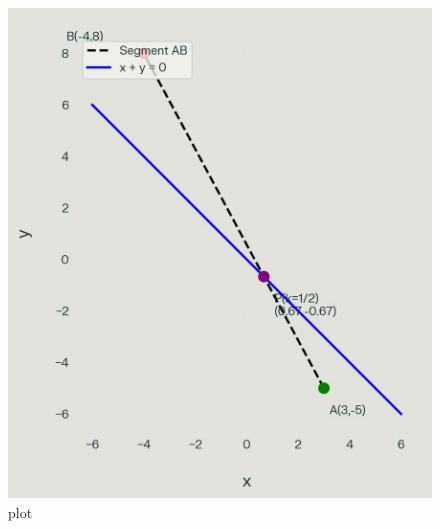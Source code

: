 \documentclass[journal]{IEEEtran}
\begin{document}
\begin{figure}[htbp]
\centering
\includegraphics[width=0.7\columnwidth]{figs/python_plot.png} 
\caption{plot}
\label{fig:1}
\end{figure}
\end{document}
